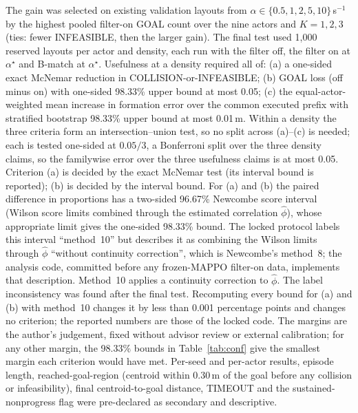 \documentclass[11pt]{article}
\begin{document}
The gain was selected on existing validation layouts from $\alpha\in\{0.5,1,2,5,10\}$\,s$^{-1}$ by the
highest pooled filter-on GOAL count over the nine actors and $K=1,2,3$ (ties: fewer INFEASIBLE, then the
larger gain). The final test used 1{,}000 reserved layouts per actor and density, each run with the
filter off, the filter on at $\alpha^\star$ and B-match at $\alpha^\star$. Usefulness at a density
required all of: (a) a one-sided exact McNemar reduction in COLLISION-or-INFEASIBLE; (b) GOAL loss
(off minus on) with one-sided 98.33\% upper bound at most 0.05; (c) the equal-actor-weighted mean
increase in formation error over the common executed prefix with stratified bootstrap 98.33\% upper
bound at most 0.01\,m. Within a density the three criteria form an intersection--union test, so no
split across (a)--(c) is needed; each is tested one-sided at $0.05/3$, a Bonferroni split over the three
density claims, so the familywise error over the three usefulness claims is at most 0.05. Criterion (a)
is decided by the exact McNemar test (its interval bound is reported); (b) is decided by the interval
bound. For (a) and (b) the paired difference in proportions has a two-sided 96.67\% Newcombe score
interval \cite{newcombe1998} (Wilson score limits combined through the estimated correlation
$\hat\phi$), whose appropriate limit gives the one-sided 98.33\% bound. The locked protocol labels this
interval ``method~10'' but describes it as combining the Wilson limits through $\hat\phi$ ``without
continuity correction'', which is Newcombe's method~8; the analysis code, committed before any
frozen-MAPPO filter-on data, implements that description. Method~10 applies a continuity correction to
$\hat\phi$. The label inconsistency was found after the final test.
Recomputing every bound for (a) and (b) with method~10 changes it by less than 0.001
percentage points and changes no criterion; the
reported numbers are those of the locked code. The margins are the author's judgement, fixed
without advisor review or external calibration; for any other margin, the 98.33\% bounds in
Table~\ref{tab:conf} give the smallest margin each criterion would have met. Per-seed and per-actor results, episode length,
reached-goal-region (centroid within 0.30\,m of the goal before any collision or infeasibility),
final centroid-to-goal distance, TIMEOUT and the sustained-nonprogress flag were pre-declared as secondary and
descriptive.
\end{document}
